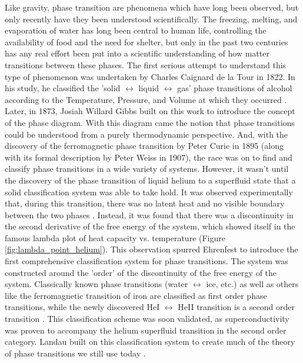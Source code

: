 \documentclass[%
 reprint,
 amsmath,amssymb,
 aps,
 pra,
]{revtex4-1}
\begin{document}
Like gravity, phase transition are phenomena which have long been observed, but only recently have they been understood scientifically. The freezing, melting, and evaporation of water has long been central to human life, controlling the availability of food and the need for shelter, but only in the past two centuries has any real effort been put into a scientific understanding of how matter transitions between these phases. The first serious attempt to understand this type of phenomenon was undertaken by Charles Caignard de la Tour in 1822. In his study, he classified the 'solid $\leftrightarrow$ liquid $\leftrightarrow$ gas' phase transitions of alcohol according to the Temperature, Pressure, and Volume at which they occurred \cite{phase_history}. Later, in 1873, Josiah Willard Gibbs built on this work to introduce the concept of the phase diagram\cite{phase_history, gibbs}. With this diagram came the notion that phase transitions could be understood from a purely thermodynamic perspective. And, with the discovery of the ferromagnetic phase transition by Peter Curie in 1895 (along with its formal description by Peter Weiss in 1907), the race was on to find and classify phase transitions in a wide variety of systems. However, it wasn't until the discovery of the phase transition of liquid helium to a superfluid state that a solid classification system was able to take hold. It was observed experimentally that, during this transition, there was no latent heat and no visible boundary between the two phases \cite{phase_history}. Instead, it was found that there was a discontinuity in the second derivative of the free energy of the system, which showed itself in the famous lambda plot of heat capacity vs. temperature (Figure \ref{fig:lambda_point_helium}). This observation spurred Ehrenfest to introduce the first comprehensive classification system for phase transitions. The system was constructed around the 'order' of the discontinuity of the free energy of the system. Classically known phase transitions (water $\leftrightarrow$ ice, etc.) as well as others like the ferromagnetic transition of iron are classified as first order phase transitions, while the newly discovered HeI $\leftrightarrow$ HeII transition is a second order transition \cite{physics_of_phase, manual}. This classification scheme was soon validated, as superconductivity was proven to accompany the helium superfluid transition in the second order category. Landau built on this classification system to create much of the theory of phase transitions we still use today \cite{manual}.
\end{document}
